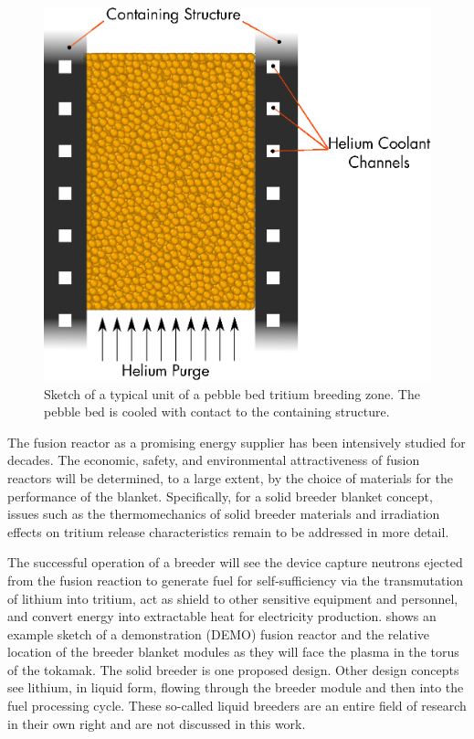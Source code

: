 \begin{figure}[ht]
	\centering
	\includegraphics[width=\singleimagewidth]{figures/solid_breeder_sketch} 
	\caption{Sketch of a typical unit of a pebble bed tritium breeding zone. The pebble bed is cooled with contact to the containing structure.}
	\label{fig:solid-breeder-sketch}
\end{figure}

The fusion reactor as a promising energy supplier has been intensively studied for decades. The economic, safety, and environmental attractiveness of fusion reactors will be determined, to a large extent, by the choice of materials for the performance of the blanket. Specifically, for a solid breeder blanket concept, issues such as the thermomechanics of solid breeder materials and irradiation effects on tritium release characteristics remain to be addressed in more detail. %

The successful operation of a breeder will see the device capture neutrons ejected from the fusion reaction to generate fuel for self-sufficiency via the transmutation of lithium into tritium, act as shield to other sensitive equipment and personnel, and convert energy into extractable heat for electricity production.  shows an example sketch of a demonstration (DEMO) fusion reactor and the relative location of the breeder blanket modules as they will face the plasma in the torus of the tokamak. The solid breeder is one proposed design. Other design concepts see lithium, in liquid form, flowing through the breeder module and then into the fuel processing cycle. These so-called liquid breeders are an entire field of research in their own right and are not discussed in this work.

